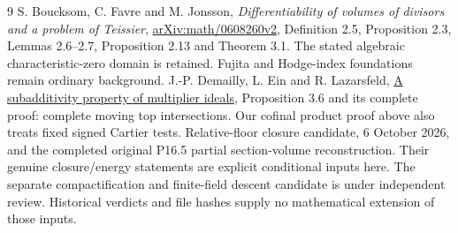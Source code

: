 \documentclass[10pt]{article}
\begin{document}
\begin{thebibliography}{9}
 S. Boucksom, C. Favre and M. Jonsson,
\emph{Differentiability of volumes of divisors and a problem of Teissier},
\href{https://arxiv.org/html/math/0608260v2}{arXiv:math/0608260v2},
Definition 2.5, Proposition 2.3, Lemmas 2.6--2.7, Proposition 2.13
and Theorem 3.1. The stated algebraic characteristic-zero domain is
retained. Fujita and Hodge-index foundations remain ordinary background.
 J.-P. Demailly, L. Ein and R. Lazarsfeld,
\href{https://arxiv.org/html/math/0002035v2}{A subadditivity property
of multiplier ideals}, Proposition 3.6 and its complete proof:
complete moving top intersections. Our cofinal product proof above
also treats fixed signed Cartier tests.
 Relative-floor closure candidate, 6 October 2026,
and the completed original P16.5 partial section-volume reconstruction.
Their genuine closure/energy statements are explicit conditional
inputs here. The separate compactification and finite-field descent
candidate is under independent review. Historical verdicts and file
hashes supply no mathematical extension of those inputs.
\end{thebibliography}
\end{document}
